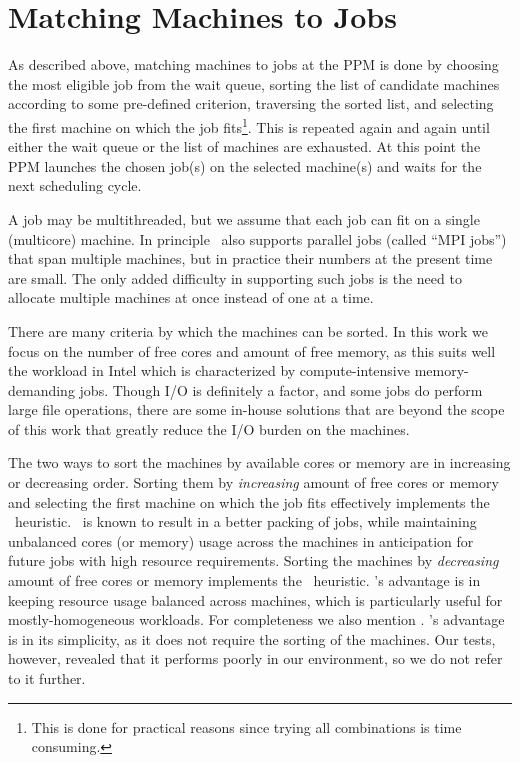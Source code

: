 \chapter{Matching Machines to Jobs}
\label{sec:matching}

As described above, matching machines to jobs at the PPM is done by
choosing the most eligible job from the wait queue, sorting the list
of candidate machines according to some pre-defined criterion,
traversing the sorted list, and selecting the first machine on which
the job fits\footnote{This is done for practical reasons since trying
  all combinations is time consuming.}.
This is repeated again and again until either the wait queue or the
list of machines are exhausted.
At this point the PPM launches the chosen job(s) on the selected
machine(s) and waits for the next scheduling cycle.

A job may be multithreaded, but we assume that each job can fit on a
single (multicore) machine.
In principle \nb\ also supports parallel jobs (called ``MPI jobs'')
that span multiple machines, but in practice their numbers at the
present time are small.
The only added difficulty in supporting such jobs is the need to
allocate multiple machines at once instead of one at a time.

There are many criteria by which the machines can be sorted.
In this work we focus on the number of free cores and amount of free
memory, as this suits well the workload in Intel which is
characterized by compute-intensive memory-demanding jobs.
Though I/O is definitely a factor, and some jobs do perform large file
operations, there are some in-house solutions that are beyond the
scope of this work that greatly reduce the I/O burden on the
machines.

The two ways to sort the machines by available cores or memory are in
increasing or decreasing order.
Sorting them by \textit{increasing} amount of free cores or memory and
selecting the first machine on which the job fits effectively
implements the \bef\ heuristic.
\bef\ is known to result in a better packing of jobs, while
maintaining unbalanced cores (or memory) usage across the machines in
anticipation for future jobs with high resource requirements.
Sorting the machines by \textit{decreasing} amount of free cores or
memory implements the \wof\ heuristic.
\wof's advantage is in keeping resource usage balanced across
machines, which is particularly useful for mostly-homogeneous
workloads.
For completeness we also mention \fif.
\fif's advantage is in its simplicity, as it does not require the
sorting of the machines.
Our tests, however, revealed that it performs poorly in our
environment, so we do not refer to it further.

